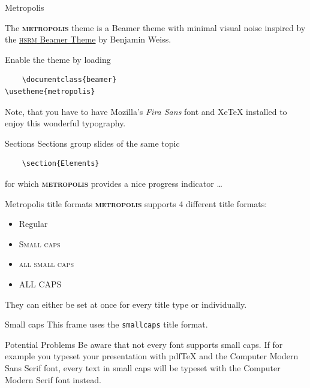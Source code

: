 \documentclass[10pt,spanish]{beamer}
\newcommand{\themename}{\textbf{\textsc{metropolis}}\xspace}
\begin{document}
\begin{frame}[fragile]{Metropolis}

The \themename theme is a Beamer theme with minimal visual noise
inspired by the \href{https://github.com/hsrmbeamertheme/hsrmbeamertheme}{\textsc{hsrm} Beamer
Theme} by Benjamin Weiss.

Enable the theme by loading

\begin{verbatim}    \documentclass{beamer}
\usetheme{metropolis}\end{verbatim}

Note, that you have to have Mozilla's \emph{Fira Sans} font and XeTeX
installed to enjoy this wonderful typography.
\end{frame}
\begin{frame}[fragile]{Sections}
Sections group slides of the same topic

\begin{verbatim}    \section{Elements}\end{verbatim}

for which \themename provides a nice progress indicator \ldots
\end{frame}


\begin{frame}{Metropolis title formats}
\themename supports 4 different title formats:
\begin{itemize}
\item Regular
\item \textsc{Small caps}
\item \textsc{all small caps}
\item ALL CAPS
\end{itemize}
They can either be set at once for every title type or individually.
\end{frame}

{
\begin{frame}{Small caps}
This frame uses the \texttt{smallcaps} title format.

\begin{alertblock}{Potential Problems}
Be aware that not every font supports small caps. If for example you typeset your presentation with pdfTeX and the Computer Modern Sans Serif font, every text in small caps will be typeset with the Computer Modern Serif font instead.
\end{alertblock}
\end{frame}
}
\end{document}
